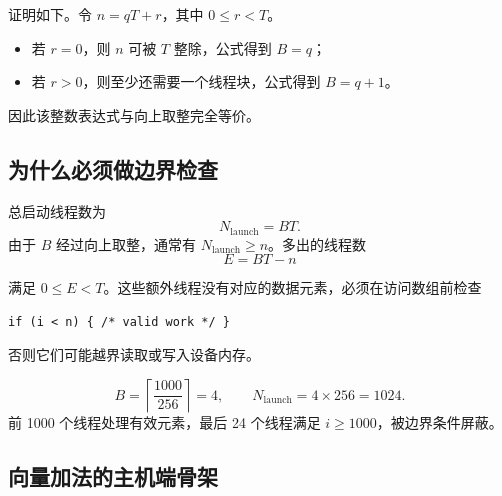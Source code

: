证明如下。令 $n=qT+r$，其中 $0\le r<T$。
\begin{itemize}
  \item 若 $r=0$，则 $n$ 可被 $T$ 整除，公式得到 $B=q$；
  \item 若 $r>0$，则至少还需要一个线程块，公式得到 $B=q+1$。
\end{itemize}
因此该整数表达式与向上取整完全等价。


\subsection{为什么必须做边界检查}

总启动线程数为
\[
N_{\mathrm{launch}}=BT.
\]
由于 $B$ 经过向上取整，通常有 $N_{\mathrm{launch}}\ge n$。多出的线程数
\[
E=BT-n
\]
\par\noindent\begin{minipage}{\linewidth}
满足 $0\le E<T$。这些额外线程没有对应的数据元素，必须在访问数组前检查
\begin{lstlisting}[style=cuda,numbers=none]
if (i < n) { /* valid work */ }
\end{lstlisting}
\end{minipage}\par
否则它们可能越界读取或写入设备内存。

\begin{examplebox}[title={例：$n=1000$，$T=256$}]
\[
B=\left\lceil\frac{1000}{256}\right\rceil=4,
\qquad
N_{\mathrm{launch}}=4\times256=1024.
\]
前 1000 个线程处理有效元素，最后 24 个线程满足 $i\ge1000$，被边界条件屏蔽。
\end{examplebox}

\subsection{向量加法的主机端骨架}

